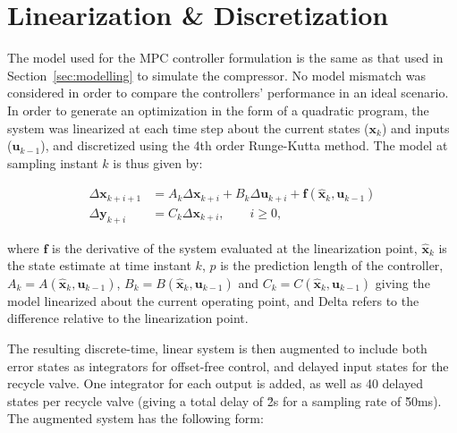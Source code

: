 \section{Linearization \& Discretization}
\label{sec:mpc:linearization}

The model used for the MPC controller formulation is the same as that used in Section~\ref{sec:modelling} to simulate the compressor.
No model mismatch was considered in order to compare the controllers' performance in an ideal scenario.
In order to generate an optimization in the form of a quadratic program, the system was linearized at each time step about the current states ($\bm{x}_k$) and inputs ($\bm{u}_{k-1}$), and discretized using the 4th order Runge-Kutta method.
The model at sampling instant $k$ is thus given by:

\begin{equation}
  \begin{split}
    \Delta \bm{x}_{k+i+1} & = A_k\Delta \bm{x}_{k+i} + B_k\Delta \bm{u}_{k+i} + \bm{f}\left( \bm{\hat{x}}_{k}, \bm{u}_{k-1} \right)\\
    \Delta \bm{y}_{k+i} & = C_k\Delta \bm{x}_{k+i}, \qquad
    i \geq 0,
  \end{split}
\end{equation}

\noindent where $\bm{f}$ is the derivative of the system evaluated at the linearization point, $\bm{\hat{x}}_k$ is the state estimate at time instant $k$, $p$ is the prediction length of the controller, $A_k = A(\bm{\hat{x}}_k, \bm{u}_{k-1})$, $B_k = B(\bm{\hat{x}}_k, \bm{u}_{k-1})$ and $C_k = C(\bm{\hat{x}}_k, \bm{u}_{k-1})$ giving the model linearized about the current operating point, and \gls*{Delta} refers to the difference relative to the linearization point.

The resulting discrete-time, linear system is then augmented to include both error states as integrators for offset-free control, and delayed input states for the recycle valve.
One integrator for each output is added, as well as 40 delayed states per recycle valve (giving a total delay of \u{2}{s} for a sampling rate of \u{50}{ms}).
The augmented system has the following form:

